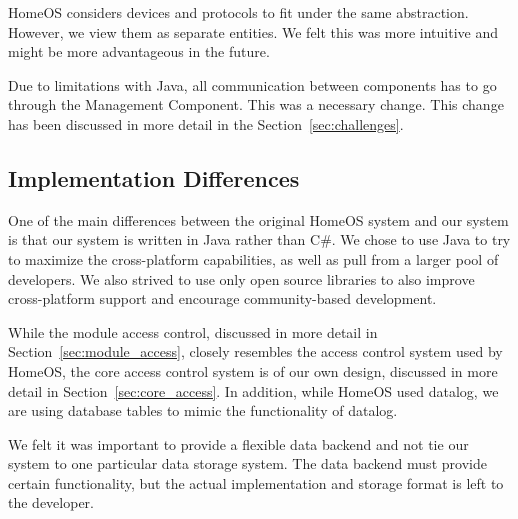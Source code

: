HomeOS considers devices and protocols to fit under the same abstraction.
However, we view them as separate entities. We felt this was more intuitive and
might be more advantageous in the future.

Due to limitations with Java, all communication between components has to go
through the Management Component. This was a necessary change. This change has 
been discussed in more detail in the Section~\ref{sec:challenges}.
\subsection{Implementation Differences}
\label{sec:impldiff} 
One of the main differences between the original HomeOS system and our system is
that our system is written in Java rather than C\#. We chose to use Java to try
to maximize the cross-platform capabilities, as well as pull from a larger pool
of developers. We also strived to use only open source libraries to also improve
cross-platform support and encourage community-based development.

While the module access control, discussed in more detail in
Section~\ref{sec:module_access}, closely resembles the access control system
used by HomeOS, the core access control system is of our own design, discussed
in more detail in Section~\ref{sec:core_access}. In addition, while HomeOS used
datalog, we are using database tables to mimic the functionality of datalog.

We felt it was important to provide a flexible data backend and not tie our
system to one particular data storage system. The data backend must provide
certain functionality, but the actual implementation and storage format is left 
to the developer.
